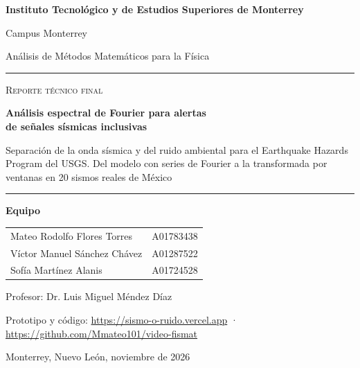 \documentclass[11pt,letterpaper]{article}
\begin{document}

\begin{titlepage}
\centering
{\large\bfseries Instituto Tecnológico y de Estudios Superiores de Monterrey\par}
\vspace{2pt}
{\large Campus Monterrey\par}
\vspace{1.2cm}
{\large Análisis de Métodos Matemáticos para la Física\par}
\vfill
{\color{navy}\rule{\textwidth}{1.2pt}}\par\vspace{0.6cm}
{\large\scshape Reporte técnico final\par}\vspace{0.3cm}
{\fontsize{24}{30}\selectfont\bfseries Análisis espectral de Fourier para alertas\\[4pt] de señales sísmicas inclusivas\par}
\vspace{0.5cm}
{\large Separación de la onda sísmica y del ruido ambiental para el Earthquake Hazards Program del USGS. Del modelo con series de Fourier a la transformada por ventanas en 20 sismos reales de México\par}
\vspace{0.6cm}
{\color{navy}\rule{\textwidth}{1.2pt}}\par
\vfill
{\large\bfseries Equipo\par}
\vspace{6pt}
\begin{tabular}{ll}
Mateo Rodolfo Flores Torres & A01783438\\
Víctor Manuel Sánchez Chávez & A01287522\\
Sofía Martínez Alanis & A01724528\\
\end{tabular}
\par\vspace{0.8cm}
{\large Profesor: Dr. Luis Miguel Méndez Díaz\par}
\vspace{4pt}
{\normalsize Prototipo y código: \url{https://sismo-o-ruido.vercel.app} · \url{https://github.com/Mmateo101/video-fismat}\par}
\vspace{1.0cm}
{\large Monterrey, Nuevo León, noviembre de 2026\par}
\end{titlepage}
\end{document}
